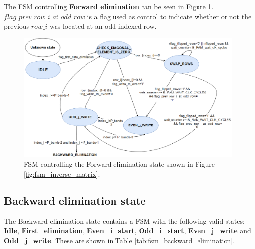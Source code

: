

The FSM controlling \textbf{Forward elimination} can be seen in Figure \ref{fig:fsm_forward_elimination}.\\ $flag\_prev\_row\_i\_at\_odd\_row$ is a flag used as control to indicate whether or not the previous $row\_i$ was located at an odd indexed row. 



\begin{figure}[H]
\centering
   \includegraphics[scale=0.4]{images/inverse_hw/fsm_forward_elimination.png}
  \caption{FSM controlling the Forward elimination state shown in Figure \ref{fig:fsm_inverse_matrix}.  } 
  \label{fig:fsm_forward_elimination}
\end{figure}


\subsection{Backward elimination state}
The Backward elimination state contains a FSM with the following valid states; \textbf{Idle}, \textbf{First\_elimination}, \textbf{Even\_i\_start}, \textbf{Odd\_i\_start}, \textbf{Even\_j\_write} and \textbf{Odd\_j\_write}. These are shown in Table \ref{tab:fsm_backward_elimination}.


